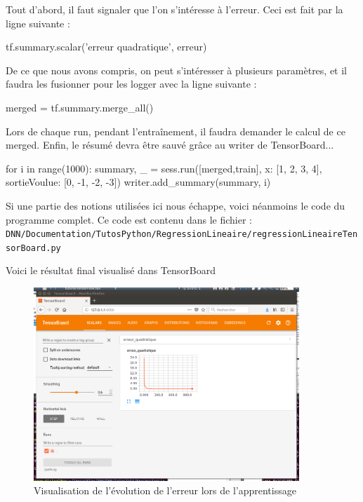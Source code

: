 \documentclass[a4paper,11pt]{book}
\begin{document}
Tout d'abord, il faut signaler que l'on s'intéresse à l'erreur. Ceci est fait par la ligne suivante :
\begin{mypython}
tf.summary.scalar('erreur quadratique', erreur)
\end{mypython}
De ce que nous avons compris, on peut s’intéresser à plusieurs paramètres, et il faudra les fusionner pour les logger avec la ligne suivante :
\begin{mypython}
merged = tf.summary.merge_all()
\end{mypython}
Lors de chaque run, pendant l’entraînement, il faudra demander le calcul de ce merged. Enfin, le résumé devra être sauvé grâce au writer de TensorBoard... 
\begin{mypython}
for i in range(1000):
  summary, _ = sess.run([merged,train], {x: [1, 2, 3, 4], sortieVoulue: [0, -1, -2, -3]})
  writer.add_summary(summary, i)
\end{mypython}
Si une partie des notions utilisées ici nous échappe, voici néanmoins le code du programme complet. Ce code est contenu dans le fichier :\\
\verb+DNN/Documentation/TutosPython/RegressionLineaire/regressionLineaireTensorBoard.py+



Voici le résultat final visualisé dans TensorBoard
\begin{figure}[H]

\begin{center}
\includegraphics[width=10cm]{./figures/TBScalarRegression.png} 
\end{center}
\caption{Visualisation de l'évolution de l'erreur lors de l'apprentissage}
\end{figure}
\end{document}
